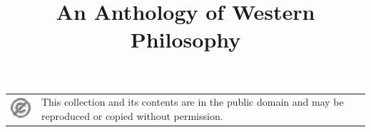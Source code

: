 \documentclass[11pt,letterpaper,twoside,openany]{book}
\begin{document}
\title{An Anthology of Western Philosophy}

\frontmatter
\maketitle
\newpage
\thispagestyle{empty}
\begin{table}[p]
\begin{tabular}{@{}m{1.7em} m{22em}@{}}
\includegraphics{icon.eps} & This collection and its contents are in
the public domain and may be reproduced or copied without
permission.\\
\end{tabular}
\end{table}
\tableofcontents
\mainmatter


\backmatter
\printbibliography
\end{document}
